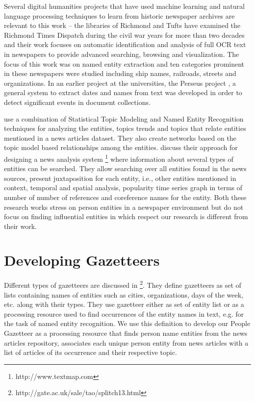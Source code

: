 \documentclass[letterpaper,11pt]{report}
\begin{document}
Several digital humanities projects that have used machine learning and natural language processing techniques to learn from historic newspaper archives are relevant to this work -- the libraries of Richmond and Tufts have examined the Richmond Times Dispatch during the civil war years for more than two decades and their work focuses on automatic identification and analysis of full OCR text in newspapers to provide advanced searching, browsing and visualization\cite{crane2006challenge}. The focus of this work was on named entity extraction and ten categories prominent in these newspapers were studied including ship names, railroads, streets and organizations. In an earlier project at the universities, the Perseus project \cite{smith2002detectinga, smith2002detectingb, smith2001disambiguating}, a general system to extract dates and names from text was developed in order to detect significant events in document collections. 

\cite{newman2006analyzing} use a combination of Statistical Topic Modeling and Named Entity Recognition techniques for analyzing the entities, topics trends and topics that relate entities mentioned in a news articles dataset. They also create networks based on the topic model based relationships among the entities.
\cite{lloyd2005lydia} discuss their approach for designing a news analysis system \footnote{http://www.textmap.com} where information about several types of entities can be searched. They allow searching over all entities found in the news sources, present juxtaposition for each entity, i.e., other entities mentioned in context, temporal and spatial analysis, popularity time series graph in terms of number of number of references and coreference names for the entity.
Both these research works stress on person entities in a newspaper environment but do not focus on finding influential entities in which respect our research is different from their work.


\section{Developing Gazetteers}
Different types of gazetteers are discussed in \footnote{http://gate.ac.uk/sale/tao/splitch13.html}. They define gazetteers as set of lists containing names of entities such as cities, organizations, days of the week, etc. along with their types. They use gazetteer either as set of entity list or as a processing resource used to ﬁnd occurrences of the entity names in text, e.g. for the task of named entity recognition. We use this definition to develop our People Gazetteer as a processing resource that finds person name entities from the news articles repository, associates each unique person entity from news articles with a list of articles of its occurrence and their respective topic.
\end{document}
